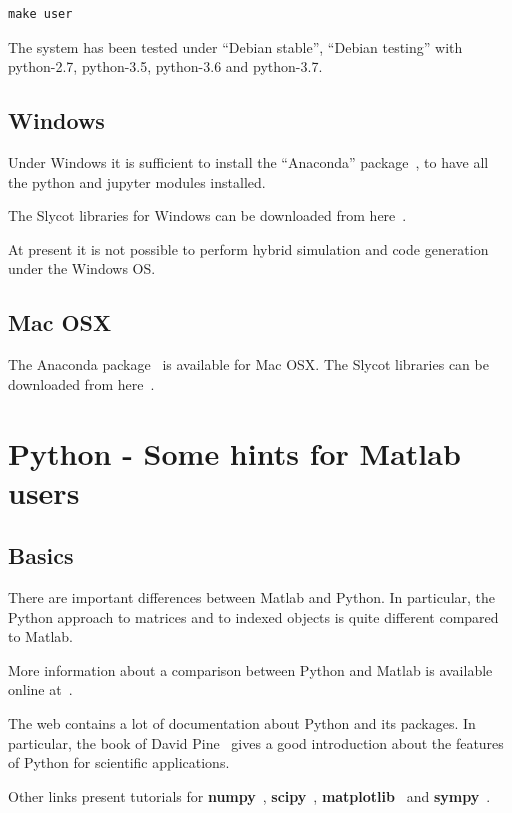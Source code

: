 \begin{verbatim}
make user
\end{verbatim}

The system has been tested under ``Debian stable'', ``Debian testing'' with 
python-2.7, python-3.5, python-3.6 and python-3.7.

\section{Windows}

Under Windows it is sufficient to install the ``Anaconda'' 
package~\cite{ANACONDA}, to have all the python and jupyter modules installed.

The Slycot libraries for Windows can be downloaded from here~\cite{SLYCOT2}.

At present it is not possible to perform hybrid simulation and code generation under the Windows OS.

\section{Mac OSX}

The Anaconda package~\cite{ANACONDA} is available for Mac OSX. The Slycot 
libraries can be downloaded from here~\cite{SLYCOT2}.

\chapter{Python - Some hints for Matlab users}

\section{Basics}
There are important differences between Matlab and Python.
In particular, the Python approach to matrices and to indexed objects is 
quite different compared to Matlab.

More information about a comparison between Python and Matlab is available 
online at~\cite{PYTHONVSMATLAB}.

The web contains a lot of documentation about Python and its packages.
In particular, the book of David Pine~\cite{PYMAN} gives a good introduction 
about the features of Python for scientific applications.

Other links present tutorials for \textbf{numpy}~\cite{NUMPY},
\textbf{scipy}~\cite{SCIPY}, \textbf{matplotlib}~\cite{MATPLOTLIB} and 
\textbf{sympy}~\cite{SYMPY}.

